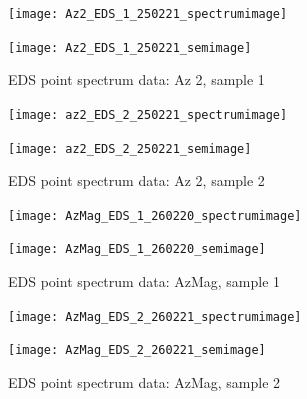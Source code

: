 \begin{figure}[H]
\centering
\begin{minipage}{.45\textwidth}
  \centering
  \texttt{[image: Az2\_EDS\_1\_250221\_spectrumimage]}
\end{minipage}
\begin{minipage}{.45\textwidth}
  \centering
  \texttt{[image: Az2\_EDS\_1\_250221\_semimage]}
\end{minipage}
\caption[EDS point spectrum data: Az 2, sample 1]{EDS point spectrum data: Az 2, sample 1}
\label{fig:az2_point_eds_1}
\end{figure}

\begin{figure}[H]
\centering
\begin{minipage}{.45\textwidth}
  \centering
  \texttt{[image: az2\_EDS\_2\_250221\_spectrumimage]}
\end{minipage}
\begin{minipage}{.45\textwidth}
  \centering
  \texttt{[image: az2\_EDS\_2\_250221\_semimage]}
\end{minipage}
\caption[EDS point spectrum data: Az 2, sample 2]{EDS point spectrum data: Az 2, sample 2}
\label{fig:az2_point_eds_2}
\end{figure}


\begin{figure}[H]
\centering
\begin{minipage}{.45\textwidth}
  \centering
  \texttt{[image: AzMag\_EDS\_1\_260220\_spectrumimage]}
\end{minipage}
\begin{minipage}{.45\textwidth}
  \centering
  \texttt{[image: AzMag\_EDS\_1\_260220\_semimage]}
\end{minipage}
\caption[EDS point spectrum data: AzMag, sample 1]{EDS point spectrum data: AzMag, sample 1}
\label{fig:azmag_point_eds_1}
\end{figure}

\begin{figure}[H]
\centering
\begin{minipage}{.45\textwidth}
  \centering
  \texttt{[image: AzMag\_EDS\_2\_260221\_spectrumimage]}
\end{minipage}
\begin{minipage}{.45\textwidth}
  \centering
  \texttt{[image: AzMag\_EDS\_2\_260221\_semimage]}
\end{minipage}
\caption[EDS point spectrum data: AzMag, sample 2]{EDS point spectrum data: AzMag, sample 2}
\label{fig:azmag_point_eds_2}
\end{figure}


